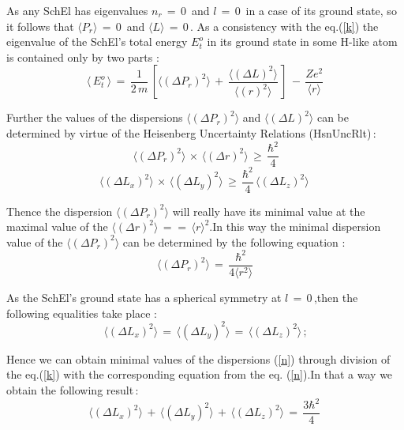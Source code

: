 \documentclass[12pt]{article}
\begin{document}
 As any SchEl has eigenvalues $n_r\,=\,0\,$ and $l\,=\,0\,$ in a case of its
ground state, so it follows that $\langle P_r \rangle \,=\,0\,$ and
$\langle L \rangle\,= \,0\,$. As a consistency with the eq.(\ref{k}) the
eigenvalue of the SchEl's total energy $E_t^o$ in its ground state in some
H-like atom is contained only by two parts :
\begin{equation}\label{j}
\langle\,E^o_t\,\rangle\,=
\,\frac{1}{2\,m}\,\left[\langle(\Delta P_r)^2 \rangle\,+
\,\frac{\langle(\Delta L)^2 \rangle}{\langle( r )^2\rangle}\,\right]\,-
\,\frac{Z e^2}{\langle r \rangle}
\end{equation}

 Further the values of the dispersions $\langle (\Delta P_r)^2\rangle$ and
$\langle(\Delta L)^2\rangle$ can be determined by virtue of the Heisenberg
Uncertainty Relations (HsnUncRlt)\,:
\begin{equation}\label{k}
\,\langle (\Delta P_r)^2\rangle\,\times\,\langle (\Delta r)^2\rangle\,\ge
\,\frac{\hbar^2}{4}
\end{equation}
\begin{equation}\label{l}
\langle (\Delta L_x)^2\rangle\,\times\,\langle (\Delta L_y)^2\rangle\,\ge
\,\frac{\hbar^2}{4}\,\langle (\Delta L_z)^2\rangle\,
\end{equation}

 Thence the dispersion $\langle(\Delta P_r)^2\rangle$ will really have its
minimal value at the maximal value of the $\langle(\Delta r)^2\rangle\,=
=\,\langle r \rangle^2$.In this way the minimal dispersion value of the $
\langle(\Delta P_r)^2\rangle$ can be determined by the following equation :
\begin{equation}\label{m}
\,\langle(\Delta P_r)^2\rangle\,=\,\frac{\hbar^2}{4\langle r^2\rangle}\,
\end{equation}

 As the SchEl's ground state has a spherical symmetry at $l\,=\,0\,$,then the
following equalities take place :
\begin{equation}\label{n}
\,\langle(\Delta L_x)^2\rangle\,=\,\langle(\Delta L_y)^2\rangle\,=
\,\langle(\Delta L_z)^2\rangle\,;
\end{equation}

 Hence we can obtain minimal values of the dispersions (\ref{n}) through
division of the eq.(\ref{k}) with the corresponding equation from the eq.
(\ref{n}).In that a way we obtain the following result\,:
\begin{equation}\label{o}
\,\langle(\Delta L_x)^2\rangle\,+\,\langle(\Delta L_y)^2\rangle\,+
\,\langle(\Delta L_z)^2\rangle\,=\,\frac{3\hbar^2}{4}\;
\end{equation}
\end{document}
